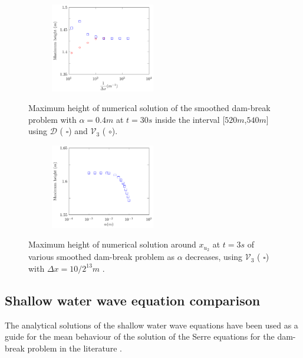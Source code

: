 \documentclass[times]{elsarticle}
\begin{document}
\begin{figure}
	\centering
	\begin{subfigure}{\textwidth}
		\centering
		\includegraphics[width=0.5\textwidth]{Figure-28.pdf}
	\end{subfigure}
	\caption{Maximum height of numerical solution of the smoothed dam-break problem with $\alpha = 0.4m$ at $t=30s$ inside the interval [$520m$,$540m$] using $\mathcal{D}$ ({\color{blue} $\square$}) and $\mathcal{V}_3$ ({\color{red} $\circ$}).}
	\label{fig:maxamp}
\end{figure}

\begin{figure}
	\centering
	\begin{subfigure}{\textwidth}
		\centering
		\includegraphics[width=0.5\textwidth]{Figure-29.pdf}
	\end{subfigure}
	\caption{Maximum height of numerical solution around $x_{u_2}$ at $t=3s$ of various smoothed dam-break problem as $\alpha$ decreases, using $\mathcal{V}_3$ ({\color{blue} $\square$}) with $\Delta x = 10 / 2^{13}m$ .}
	\label{fig:maxampa}
\end{figure}

\subsection{Shallow water wave equation comparison}
The analytical solutions of the shallow water wave equations have been used as a guide for the mean behaviour of the solution of the Serre equations for the dam-break problem in the literature \cite{Hank-etal-2010-2034,Mitsotakis-etal-2014}.
\end{document}
